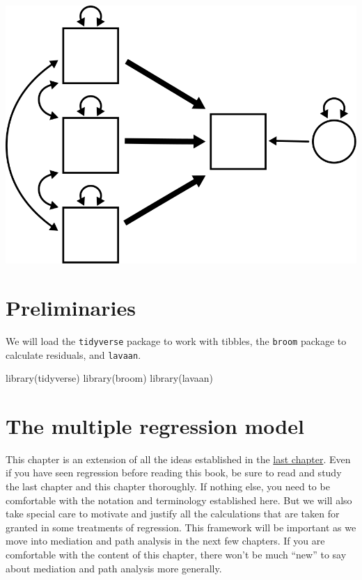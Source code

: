 \documentclass[
]{book}
\newenvironment{Shaded}{\begin{snugshade}}{\end{snugshade}}
\newcommand{\FunctionTok}[1]{\textcolor[rgb]{0.00,0.00,0.00}{#1}}
\newcommand{\NormalTok}[1]{#1}
\begin{document}
\begin{center}\includegraphics{graphics/multiple_regression} \end{center}

\hypertarget{preliminaries-1}{%
\section*{Preliminaries}\label{preliminaries-1}}

We will load the \texttt{tidyverse} package to work with tibbles, the \texttt{broom} package to calculate residuals, and \texttt{lavaan}.

\begin{Shaded}
\begin{Highlighting}[]
\FunctionTok{library}\NormalTok{(tidyverse)}
\FunctionTok{library}\NormalTok{(broom)}
\FunctionTok{library}\NormalTok{(lavaan)}
\end{Highlighting}
\end{Shaded}

\hypertarget{multiple-model}{%
\section{The multiple regression model}\label{multiple-model}}

This chapter is an extension of all the ideas established in the \protect\hyperlink{simple}{last chapter}. Even if you have seen regression before reading this book, be sure to read and study the last chapter and this chapter thoroughly. If nothing else, you need to be comfortable with the notation and terminology established here. But we will also take special care to motivate and justify all the calculations that are taken for granted in some treatments of regression. This framework will be important as we move into mediation and path analysis in the next few chapters. If you are comfortable with the content of this chapter, there won't be much ``new'' to say about mediation and path analysis more generally.
\end{document}
